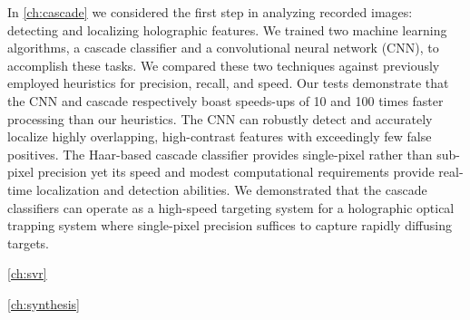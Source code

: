 In \autoref{ch:cascade} we considered the first step in analyzing recorded
images: detecting and localizing holographic features. We trained two machine
learning algorithms, a cascade classifier and a convolutional neural network (CNN),
to accomplish these tasks. We compared these two techniques against previously
employed heuristics for precision, recall, and speed. Our tests demonstrate that
the CNN and cascade respectively boast speeds-ups of \num{10} and \num{100} times
faster processing than our heuristics. The CNN can robustly detect and accurately
localize highly overlapping, high-contrast features with exceedingly few false positives.
The Haar-based cascade classifier provides single-pixel rather than
sub-pixel precision yet its speed and modest computational requirements provide
real-time localization and detection abilities. We demonstrated that the cascade
classifiers can operate as a high-speed targeting system for a holographic
optical trapping system where single-pixel precision suffices to capture
rapidly diffusing targets.

\autoref{ch:svr}

\autoref{ch:synthesis}

